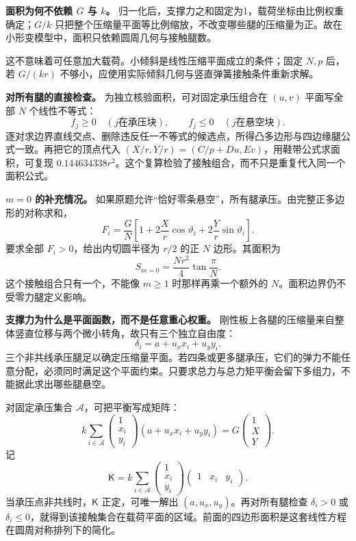 \documentclass[12pt,a4paper,UTF8]{ctexart}
\begin{document}
\textbf{面积为何不依赖 \(G\) 与 \(k\)。}
归一化后，支撑力之和固定为1，载荷坐标由比例权重确定；\(G/k\)
只把整个压缩量平面等比例缩放，不改变哪些腿的压缩量为正。故在小形变模型中，面积只依赖圆周几何与接触腿数。

这不意味着可任意加大载荷。小倾斜是线性压缩平面成立的条件；固定 \(N,p\)
后，若 \(G/(kr)\) 不够小，应使用实际倾斜几何与竖直弹簧接触条件重新求解。

\textbf{对所有腿的直接检查。} 为独立核验面积，可对固定承压组合在
\((u,v)\) 平面写全部 \(N\) 个线性不等式： \[
f_j\ge0\quad(j\text{在承压块}),
\qquad
f_j\le0\quad(j\text{在悬空块}).
\]
逐对求边界直线交点、删除违反任一不等式的候选点，所得凸多边形与四边缘腿公式一致。再把它的顶点代入
\((X/r,Y/r)=(C/p+Du,Ev)\)，用鞋带公式求面积，可复现
\(0.144634338r^2\)。这个复算检验了接触组合，而不只是重复代入同一个面积公式。

\textbf{\(m=0\) 的补充情况。}
如果原题允许``恰好零条悬空''，所有腿承压。由完整正多边形的对称求和， \[
F_i=\frac GN\left[1+2\frac Xr\cos\vartheta_i+2\frac Yr\sin\vartheta_i\right].
\] 要求全部 \(F_i>0\)，给出内切圆半径为 \(r/2\) 的正 \(N\)
边形。其面积为 \[
\boxed{S_{m=0}=\frac{Nr^2}{4}\tan\frac\pi N}.
\] 这个接触组合只有一个，不能像 \(m\ge1\) 时那样再乘一个额外的
\(N\)。面积边界仍不受零力腿定义影响。

\textbf{支撑力为什么是平面函数，而不是任意重心权重。}
刚性板上各腿的压缩量来自整体竖直位移与两个微小转角，故只有三个独立自由度：
\[
\delta_i=a+u_xx_i+u_yy_i.
\]
三个非共线承压腿足以确定压缩量平面。若四条或更多腿承压，它们的弹力不能任意分配，必须同时满足这个平面约束。只要求总力与总力矩平衡会留下多组力，不能据此求出哪些腿悬空。

对固定承压集合 \(\mathcal A\)，可把平衡写成矩阵： \[
k\sum_{i\in\mathcal A}
\begin{pmatrix}1\\x_i\\y_i\end{pmatrix}
(a+u_xx_i+u_yy_i)
=G\begin{pmatrix}1\\X\\Y\end{pmatrix}.
\] 记 \[
\mathsf K=k\sum_{i\in\mathcal A}
\begin{pmatrix}1\\x_i\\y_i\end{pmatrix}
\begin{pmatrix}1&x_i&y_i\end{pmatrix}.
\] 当承压点非共线时，\(\mathsf K\) 正定，可唯一解出
\((a,u_x,u_y)\)。再对所有腿检查 \(\delta_i>0\) 或
\(\delta_i\le0\)，就得到该接触集合在载荷平面的区域。前面的四边形面积是这套线性方程在圆周对称排列下的简化。
\end{document}
